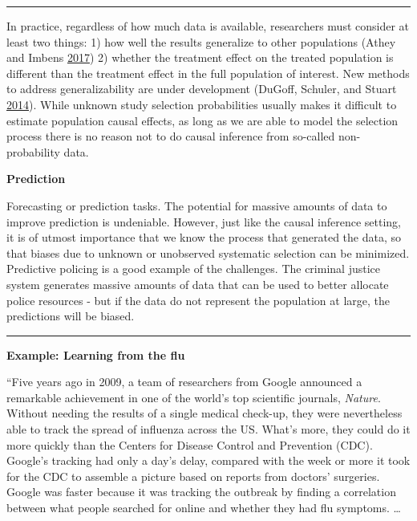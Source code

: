 \documentclass[]{krantz}
\begin{document}
\begin{center}\rule{0.5\linewidth}{\linethickness}\end{center}

In practice, regardless of how much data is available, researchers must
consider at least two things: 1) how well the results generalize to
other populations (Athey and Imbens
\protect\hyperlink{ref-athey2017state}{2017}) 2) whether the treatment
effect on the treated population is different than the treatment effect
in the full population of interest. New methods to address
generalizability are under development (DuGoff, Schuler, and Stuart
\protect\hyperlink{ref-dugoff2014generalizing}{2014}). While unknown
study selection probabilities usually makes it difficult to estimate
population causal effects, as long as we are able to model the selection
process there is no reason not to do causal inference from so-called
non-probability data.

\textbf{Prediction}

Forecasting or prediction tasks. The potential for massive amounts of
data to improve prediction is undeniable. However, just like the causal
inference setting, it is of utmost importance that we know the process
that generated the data, so that biases due to unknown or unobserved
systematic selection can be minimized. Predictive policing is a good
example of the challenges. The criminal justice system generates massive
amounts of data that can be used to better allocate police resources -
but if the data do not represent the population at large, the
predictions will be biased.

\begin{center}\rule{0.5\linewidth}{\linethickness}\end{center}

\textbf{Example: Learning from the flu}

``Five years ago in 2009, a team of researchers from Google announced a
remarkable achievement in one of the world's top scientific journals,
\emph{Nature}. Without needing the results of a single medical check-up,
they were nevertheless able to track the spread of influenza across the
US. What's more, they could do it more quickly than the Centers for
Disease Control and Prevention (CDC). Google's tracking had only a day's
delay, compared with the week or more it took for the CDC to assemble a
picture based on reports from doctors' surgeries. Google was faster
because it was tracking the outbreak by finding a correlation between
what people searched for online and whether they had flu symptoms.
\ldots{}
\end{document}
